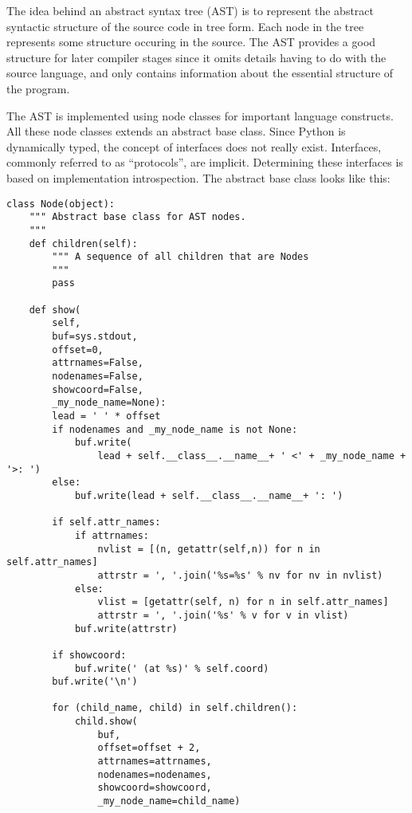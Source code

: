 The idea behind an abstract syntax tree (AST) is to represent the
abstract syntactic structure of the source code in tree form. Each
node in the tree represents some structure occuring in the source. The
AST provides a good structure for later compiler stages since it omits
details having to do with the source language, and only contains
information about the essential structure of the program.

The AST is implemented using node classes for important language
constructs. All these node classes extends an abstract base
class. Since Python is dynamically typed, the concept of interfaces
does not really exist. Interfaces, commonly referred to as
``protocols'', are implicit. Determining these interfaces is based on
implementation introspection. The abstract base class looks like this:

\begin{lstlisting}
class Node(object):
    """ Abstract base class for AST nodes.
    """
    def children(self):
        """ A sequence of all children that are Nodes
        """
        pass

    def show(
        self,
        buf=sys.stdout,
        offset=0,
        attrnames=False,
        nodenames=False,
        showcoord=False,
        _my_node_name=None):
        lead = ' ' * offset
        if nodenames and _my_node_name is not None:
            buf.write(
                lead + self.__class__.__name__+ ' <' + _my_node_name + '>: ')
        else:
            buf.write(lead + self.__class__.__name__+ ': ')

        if self.attr_names:
            if attrnames:
                nvlist = [(n, getattr(self,n)) for n in self.attr_names]
                attrstr = ', '.join('%s=%s' % nv for nv in nvlist)
            else:
                vlist = [getattr(self, n) for n in self.attr_names]
                attrstr = ', '.join('%s' % v for v in vlist)
            buf.write(attrstr)

        if showcoord:
            buf.write(' (at %s)' % self.coord)
        buf.write('\n')

        for (child_name, child) in self.children():
            child.show(
                buf,
                offset=offset + 2,
                attrnames=attrnames,
                nodenames=nodenames,
                showcoord=showcoord,
                _my_node_name=child_name)
\end{lstlisting}

